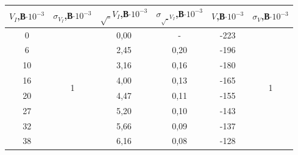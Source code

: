 \documentclass[a4paper,12pt]{report}
\begin{document}
\begin{table}[H]
\begin{tabular}{|c|c|c|c|c|c|}
\hline
$V_{I}$,В$\cdot10^{-3}$ & $\sigma_{V_I}$,В$\cdot10^{-3}$ & $\sqrt_{V_I}$,В$\cdot10^{-3}$ & $\sigma_{\sqrt_{V_I}}$,В$\cdot10^{-3}$ & $V$,В$\cdot10^{-3}$ & $\sigma_{V}$,В$\cdot10^{-3}$ \\ \hline
0                             & \multirow{14}{*}{1}                   & 0,00                              & -                                 & -223                         & \multirow{14}{*}{1}                  \\ \cline{1-1} \cline{3-5}
6                             &                                       & 2,45                              & 0,20                              & -196                         &                                      \\ \cline{1-1} \cline{3-5}
10                            &                                       & 3,16                              & 0,16                              & -180                         &                                      \\ \cline{1-1} \cline{3-5}
16                            &                                       & 4,00                              & 0,13                              & -165                         &                                      \\ \cline{1-1} \cline{3-5}
20                            &                                       & 4,47                              & 0,11                              & -155                         &                                      \\ \cline{1-1} \cline{3-5}
27                            &                                       & 5,20                              & 0,10                              & -143                         &                                      \\ \cline{1-1} \cline{3-5}
32                            &                                       & 5,66                              & 0,09                              & -137                         &                                      \\ \cline{1-1} \cline{3-5}
38                            &                                       & 6,16                              & 0,08                              & -128                         &                                      \\ \cline{1-1} \cline{3-5}

\end{tabular}
\end{table}
\end{document}
